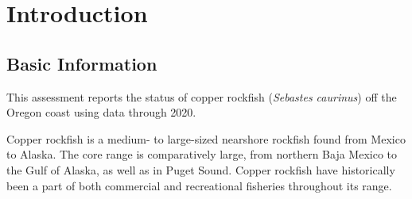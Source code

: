 \documentclass[11pt,
  english,
  a4paper,
]{article}
\begin{document}
\newcommand{\lt}{\ensuremath <}
\newcommand{\gt}{\ensuremath >}

\setcounter{page}{1}

\renewcommand{\thetable}{\roman{table}}
\renewcommand{\thefigure}{\roman{figure}}

\setlength\parskip{0.5em plus 0.1em minus 0.2em}

\vspace{500cm}

\pagebreak

\pagebreak
\setlength{\parskip}{5mm plus1mm minus1mm}
\setcounter{page}{1}
\renewcommand{\thefigure}{\arabic{figure}}
\renewcommand{\thetable}{\arabic{table}}
\setcounter{table}{0}
\setcounter{figure}{0}

\setlength\parskip{0.5em plus 0.1em minus 0.2em}


\hypertarget{introduction}{%
\section{Introduction}\label{introduction}}

\leavevmode\tagmcend\tagstructend


\hypertarget{basic-information}{%
\subsection{Basic Information}\label{basic-information}}

\leavevmode\tagmcend\tagstructend


This assessment reports the status of copper rockfish (\emph{Sebastes caurinus}) off the Oregon coast using data through 2020.

\leavevmode\tagmcend\tagstructend\par


Copper rockfish is a medium- to large-sized nearshore rockfish found from Mexico to Alaska. The core range is comparatively large, from northern Baja Mexico to the Gulf of Alaska, as well as in Puget Sound. Copper rockfish have historically been a part of both commercial and recreational fisheries throughout its range.
\end{document}
